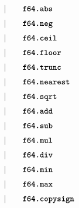 \begin{alignat*}{9}
    &&       &&\quad | &\quad && \textbf{\texttt{f64.abs}} \quad &&  \\[1mm]
    &&       &&\quad | &\quad && \textbf{\texttt{f64.neg}} \quad &&  \\[1mm]
    &&       &&\quad | &\quad && \textbf{\texttt{f64.ceil}} \quad &&  \\[1mm]
    &&       &&\quad | &\quad && \textbf{\texttt{f64.floor}} \quad &&  \\[1mm]
    &&       &&\quad | &\quad && \textbf{\texttt{f64.trunc}} \quad &&  \\[1mm]
    &&       &&\quad | &\quad && \textbf{\texttt{f64.nearest}} \quad &&  \\[1mm]
    &&       &&\quad | &\quad && \textbf{\texttt{f64.sqrt}} \quad &&  \\[1mm]
    &&       &&\quad | &\quad && \textbf{\texttt{f64.add}} \quad &&  \\[1mm]
    &&       &&\quad | &\quad && \textbf{\texttt{f64.sub}} \quad &&  \\[1mm]
    &&       &&\quad | &\quad && \textbf{\texttt{f64.mul}} \quad &&  \\[1mm]
    &&       &&\quad | &\quad && \textbf{\texttt{f64.div}} \quad &&  \\[1mm]
    &&       &&\quad | &\quad && \textbf{\texttt{f64.min}} \quad &&  \\[1mm]
    &&       &&\quad | &\quad && \textbf{\texttt{f64.max}} \quad &&  \\[1mm]
    &&       &&\quad | &\quad && \textbf{\texttt{f64.copysign}} \quad &&  \\[1mm]
\end{alignat*}

